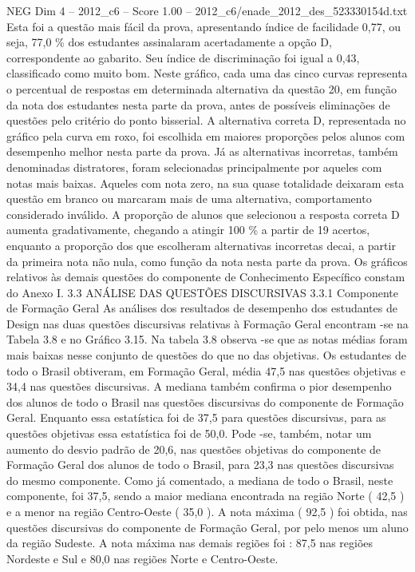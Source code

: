 \begin{textsample}{NEG Dim 4 – 2012\_c6 – Score 1.00 – 2012\_c6/enade\_2012\_des\_523330154d.txt}
Esta foi a questão mais fácil da prova, apresentando índice de facilidade 0,77, ou seja, 77,0 \% dos estudantes assinalaram acertadamente a opção D, correspondente ao gabarito.
Seu índice de discriminação foi igual a 0,43, classificado como muito bom.
Neste gráfico, cada uma das cinco curvas representa o percentual de respostas em determinada alternativa da questão 20, em função da nota dos estudantes nesta parte da prova, antes de possíveis eliminações de questões pelo critério do ponto bisserial.
A alternativa correta D, representada no gráfico pela curva em roxo, foi escolhida em maiores proporções pelos alunos com desempenho melhor nesta parte da prova.
Já as alternativas incorretas, também denominadas distratores, foram selecionadas principalmente por aqueles com notas mais baixas.
Aqueles com nota zero, na sua quase totalidade deixaram esta questão em branco ou marcaram mais de uma alternativa, comportamento considerado inválido.
A proporção de alunos que selecionou a resposta correta D aumenta gradativamente, chegando a atingir 100 \% a partir de 19 acertos, enquanto a proporção dos que escolheram alternativas incorretas decai, a partir da primeira nota não nula, como função da nota nesta parte da prova.
Os gráficos relativos às demais questões do componente de Conhecimento Específico constam do Anexo I. 3.3 ANÁLISE DAS QUESTÕES DISCURSIVAS 3.3.1 Componente de Formação Geral As análises dos resultados de desempenho dos estudantes de Design nas duas questões discursivas relativas à Formação Geral encontram -se na Tabela 3.8 e no Gráfico 3.15.
Na tabela 3.8 observa -se que as notas médias foram mais baixas nesse conjunto de questões do que no das objetivas.
Os estudantes de todo o Brasil obtiveram, em Formação Geral, média 47,5 nas questões objetivas e 34,4 nas questões discursivas.
A mediana também confirma o pior desempenho dos alunos de todo o Brasil nas questões discursivas do componente de Formação Geral.
Enquanto essa estatística foi de 37,5 para questões discursivas, para as questões objetivas essa estatística foi de 50,0.
Pode -se, também, notar um aumento do desvio padrão de 20,6, nas questões objetivas do componente de Formação Geral dos alunos de todo o Brasil, para 23,3 nas questões discursivas do mesmo componente.
Como já comentado, a mediana de todo o Brasil, neste componente, foi 37,5, sendo a maior mediana encontrada na região Norte ( 42,5 ) e a menor na região Centro-Oeste ( 35,0 ).
A nota máxima ( 92,5 ) foi obtida, nas questões discursivas do componente de Formação Geral, por pelo menos um aluno da região Sudeste.
A nota máxima nas demais regiões foi : 87,5 nas regiões Nordeste e Sul e 80,0 nas regiões Norte e Centro-Oeste.

\end{textsample}
